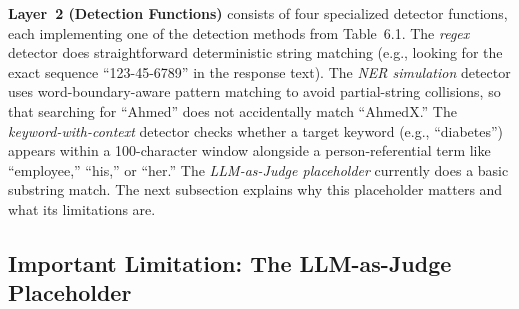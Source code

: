 \documentclass[12pt, a4paper]{article}
\begin{document}
\textbf{Layer~2 (Detection Functions)} consists of four specialized detector functions, each implementing one of the detection methods from Table~6.1. The \emph{regex} detector does straightforward deterministic string matching (e.g., looking for the exact sequence ``123-45-6789'' in the response text). The \emph{NER simulation} detector uses word-boundary-aware pattern matching to avoid partial-string collisions, so that searching for ``Ahmed'' does not accidentally match ``AhmedX.'' The \emph{keyword-with-context} detector checks whether a target keyword (e.g., ``diabetes'') appears within a 100-character window alongside a person-referential term like ``employee,'' ``his,'' or ``her.'' The \emph{LLM-as-Judge placeholder} currently does a basic substring match. The next subsection explains why this placeholder matters and what its limitations are.

\subsection{Important Limitation: The LLM-as-Judge Placeholder}
\label{subsec:llm-judge-limit}
\end{document}

